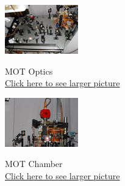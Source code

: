 \documentclass{../lab}
\begin{document}
\noindent
\begin{figure}[H]
  \href{http://experimentationlab.berkeley.edu/sites/default/files/images/MOT_318_1.jpg}{\includegraphics[width=\linewidth,keepaspectratio]{images/120px-MOT_318_t1.jpg}}
  \caption{MOT Optics\\ \href{http://experimentationlab.berkeley.edu/sites/default/files/images/MOT_318_1.jpg}{Click here to see larger picture}}
  \label{fig:MOT_318_1.jpg}
\endminipage\hfill
{}
  \href{http://experimentationlab.berkeley.edu/sites/default/files/images/MOTChamber_284_1.jpg}{\includegraphics[width=\linewidth,keepaspectratio]{images/120px-MOTChamber_284_t1.jpg}}
  \caption{MOT Chamber\\
  \href{http://experimentationlab.berkeley.edu/sites/default/files/images/MOTChamber_284_1.jpg}{Click here to see larger picture}}
  \label{fig:MOTChamber_284_1.jpg}

\end{figure}
\end{document}
